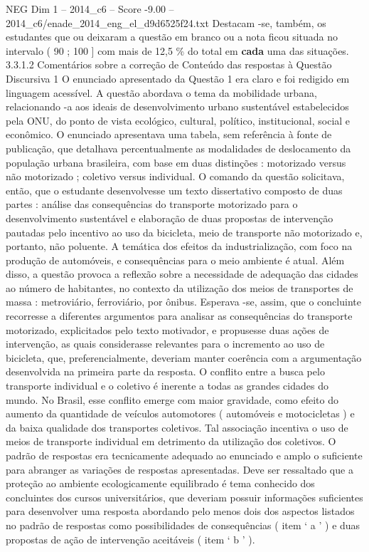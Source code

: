 \begin{textsample}{NEG Dim 1 – 2014\_c6 – Score -9.00 – 2014\_c6/enade\_2014\_eng\_el\_d9d6525f24.txt}
Destacam -se, também, os estudantes que ou deixaram a questão em branco ou a nota ficou situada no intervalo ( 90 ; 100 ] com mais de 12,5 \% do total em \textbf{cada} uma das situações. 3.3.1.2 Comentários sobre a correção de Conteúdo das respostas à Questão Discursiva 1 O enunciado apresentado da Questão 1 era claro e foi redigido em linguagem acessível.
A questão abordava o tema da mobilidade urbana, relacionando -a aos ideais de desenvolvimento urbano sustentável estabelecidos pela ONU, do ponto de vista ecológico, cultural, político, institucional, social e econômico.
O enunciado apresentava uma tabela, sem referência à fonte de publicação, que detalhava percentualmente as modalidades de deslocamento da população urbana brasileira, com base em duas distinções : motorizado versus não motorizado ; coletivo versus individual.
O comando da questão solicitava, então, que o estudante desenvolvesse um texto dissertativo composto de duas partes : análise das consequências do transporte motorizado para o desenvolvimento sustentável e elaboração de duas propostas de intervenção pautadas pelo incentivo ao uso da bicicleta, meio de transporte não motorizado e, portanto, não poluente.
A temática dos efeitos da industrialização, com foco na produção de automóveis, e consequências para o meio ambiente é atual.
Além disso, a questão provoca a reflexão sobre a necessidade de adequação das cidades ao número de habitantes, no contexto da utilização dos meios de transportes de massa : metroviário, ferroviário, por ônibus.
Esperava -se, assim, que o concluinte recorresse a diferentes argumentos para analisar as consequências do transporte motorizado, explicitados pelo texto motivador, e propusesse duas ações de intervenção, as quais considerasse relevantes para o incremento ao uso de bicicleta, que, preferencialmente, deveriam manter coerência com a argumentação desenvolvida na primeira parte da resposta.
O conflito entre a busca pelo transporte individual e o coletivo é inerente a todas as grandes cidades do mundo.
No Brasil, esse conflito emerge com maior gravidade, como efeito do aumento da quantidade de veículos automotores ( automóveis e motocicletas ) e da baixa qualidade dos transportes coletivos.
Tal associação incentiva o uso de meios de transporte individual em detrimento da utilização dos coletivos.
O padrão de respostas era tecnicamente adequado ao enunciado e amplo o suficiente para abranger as variações de respostas apresentadas.
Deve ser ressaltado que a proteção ao ambiente ecologicamente equilibrado é tema conhecido dos concluintes dos cursos universitários, que deveriam possuir informações suficientes para desenvolver uma resposta abordando pelo menos dois dos aspectos listados no padrão de respostas como possibilidades de consequências ( item ‘ a ’ ) e duas propostas de ação de intervenção aceitáveis ( item ‘ b ’ ).

\end{textsample}
